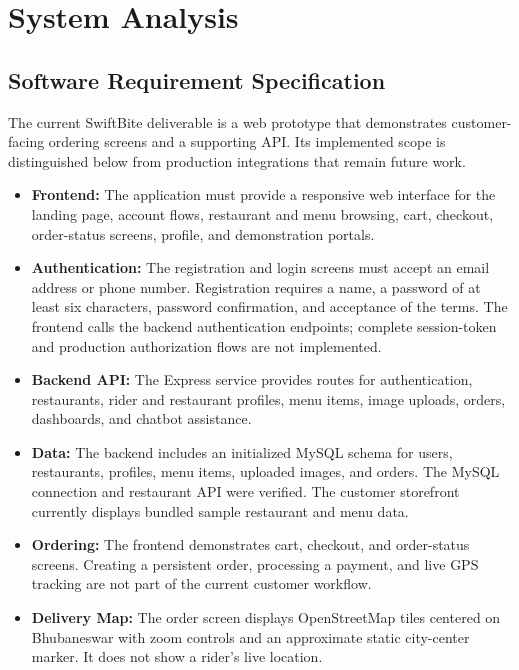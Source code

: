 \chapter{System Analysis}

\section{Software Requirement Specification}

The current SwiftBite deliverable is a web prototype that demonstrates customer-facing ordering screens and a supporting API. Its implemented scope is distinguished below from production integrations that remain future work.

\begin{itemize}

\item \textbf{Frontend:} The application must provide a responsive web interface for the landing page, account flows, restaurant and menu browsing, cart, checkout, order-status screens, profile, and demonstration portals.

\item \textbf{Authentication:} The registration and login screens must accept an email address or phone number. Registration requires a name, a password of at least six characters, password confirmation, and acceptance of the terms. The frontend calls the backend authentication endpoints; complete session-token and production authorization flows are not implemented.

\item \textbf{Backend API:} The Express service provides routes for authentication, restaurants, rider and restaurant profiles, menu items, image uploads, orders, dashboards, and chatbot assistance.

\item \textbf{Data:} The backend includes an initialized MySQL schema for users, restaurants, profiles, menu items, uploaded images, and orders. The MySQL connection and restaurant API were verified. The customer storefront currently displays bundled sample restaurant and menu data.

\item \textbf{Ordering:} The frontend demonstrates cart, checkout, and order-status screens. Creating a persistent order, processing a payment, and live GPS tracking are not part of the current customer workflow.

\item \textbf{Delivery Map:} The order screen displays OpenStreetMap tiles centered on Bhubaneswar with zoom controls and an approximate static city-center marker. It does not show a rider's live location.


\end{itemize}
